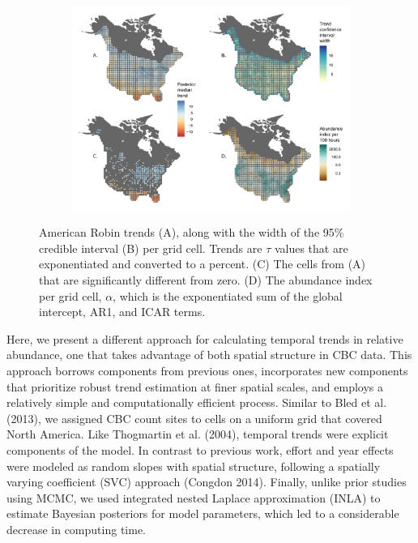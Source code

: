 \documentclass[]{article}
\begin{document}
\begin{figure}[t]
  \centering
  \begin{subfigure}[t]{0.99\textwidth}
    \centering
    \includegraphics[width=\textwidth]{trend_and_index} 
  \end{subfigure}
  \caption{American Robin trends (A), along with the width of the 95\% credible interval (B) per grid cell. Trends are $\tau$ values that are exponentiated and converted to a percent. (C) The cells from (A) that are significantly different from zero. (D) The abundance index per grid cell, $\alpha$, which is the exponentiated sum of the global intercept, AR1, and ICAR terms.}
\end{figure}

Here, we present a different approach for calculating temporal trends in relative abundance, one that takes advantage of both spatial structure in CBC data. This approach borrows components from previous ones, incorporates new components that prioritize robust trend estimation at finer spatial scales, and employs a relatively simple and computationally efficient process. Similar to Bled et al. (2013), we assigned CBC count sites to cells on a uniform grid that covered North America. Like Thogmartin et al. (2004), temporal trends were explicit components of the model. In contrast to previous work, effort and year effects were modeled as random slopes with spatial structure, following a spatially varying coefficient (SVC) approach (Congdon 2014). Finally, unlike prior studies using MCMC, we used integrated nested Laplace approximation (INLA) to estimate Bayesian posteriors for model parameters, which led to a considerable decrease in computing time.
\end{document}
